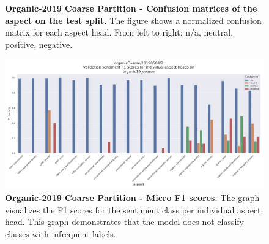 \begin{figure}[H]
	\hspace{0mm}
	\caption{\textbf{Organic-2019 Coarse Partition - Confusion matrices of the aspect on the test split.} The figure shows a normalized confusion matrix for each aspect head. From left to right: n/a, neutral, positive, negative.}
\end{figure}

\begin{figure}[H]
	\centering
	\includegraphics[width=\textwidth]{figures/08_appendix/08_og_coarse_results}
	\caption{\textbf{Organic-2019 Coarse Partition - Micro F1 scores.} The graph visualizes the F1 scores for the sentiment class per individual aspect head. This graph demonstrates that the model does not classify classes with infrequent labels.}
	\label{fig:06_HpOptim_CnnParams2}
\end{figure}
